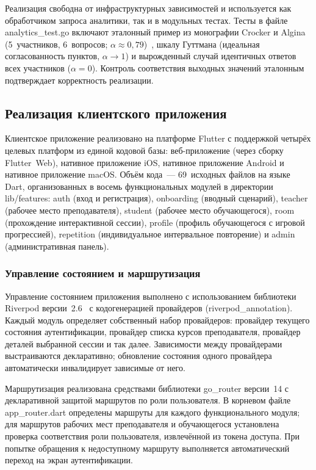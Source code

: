 Реализация свободна от инфраструктурных зависимостей и используется
как обработчиком запроса аналитики, так и в модульных тестах.
Тесты в файле analytics\_test.go включают эталонный
пример из монографии Crocker и Algina (5~участников, 6~вопросов;
$\alpha \approx 0{,}79$)~\cite{crocker_algina}, шкалу Гуттмана
(идеальная согласованность пунктов, $\alpha \to 1$) и
вырожденный случай идентичных ответов всех участников
($\alpha = 0$). Контроль соответствия выходных значений
эталонным подтверждает корректность реализации.

\subsection{Реализация клиентского приложения}

Клиентское приложение реализовано на платформе Flutter с
поддержкой четырёх целевых платформ из единой кодовой базы:
веб-приложение (через сборку Flutter~Web), нативное приложение
iOS, нативное приложение Android и нативное приложение macOS.
Объём кода~--- 69~исходных файлов на языке Dart, организованных
в восемь функциональных модулей в директории lib/features:
auth (вход и регистрация), onboarding
(вводный сценарий), teacher (рабочее место преподавателя),
student (рабочее место обучающегося), room
(прохождение интерактивной сессии), profile (профиль
обучающегося с игровой прогрессией), repetition
(индивидуальное интервальное повторение) и admin
(административная панель).

\subsubsection{Управление состоянием и маршрутизация}

Управление состоянием приложения выполнено с использованием
библиотеки Riverpod версии~2.6~\cite{riverpod_docs} с
кодогенерацией провайдеров (riverpod\_annotation).
Каждый модуль определяет собственный набор провайдеров: провайдер
текущего состояния аутентификации, провайдер списка курсов
преподавателя, провайдер деталей выбранной сессии и так далее.
Зависимости между провайдерами выстраиваются декларативно;
обновление состояния одного провайдера автоматически инвалидирует
зависимые от него.

Маршрутизация реализована средствами библиотеки go\_router
версии~14 с декларативной защитой маршрутов по роли пользователя.
В корневом файле app\_router.dart определены маршруты
для каждого функционального модуля; для маршрутов рабочих мест
преподавателя и обучающегося установлена проверка соответствия
роли пользователя, извлечённой из токена доступа. При попытке
обращения к недоступному маршруту выполняется автоматический
переход на экран аутентификации.

